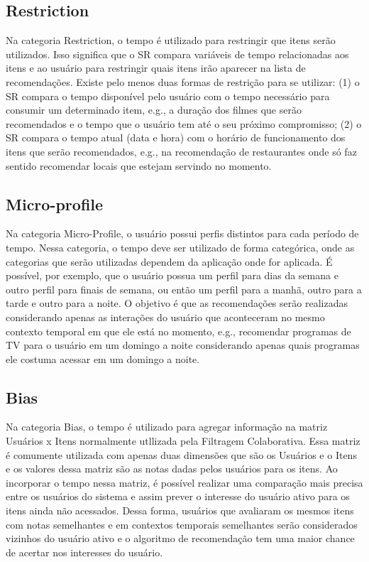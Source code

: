 \subsection{Restriction}

Na categoria Restriction, o tempo é utilizado para restringir que itens serão utilizados. Isso significa que o SR
compara variáveis de tempo relacionadas aos itens e ao usuário para restringir quais itens irão aparecer na lista de
recomendações. Existe pelo menos duas formas de restrição para se utilizar: (1) o SR compara o tempo disponível pelo
usuário com o tempo necessário para consumir um determinado item, e.g., a duração dos filmes que serão recomendados e
o tempo que o usuário tem até o seu próximo compromisso; (2) o SR compara o tempo atual (data e hora) com o horário de
funcionamento dos itens que serão recomendados, e.g., na recomendação de restaurantes onde só faz sentido recomendar
locais que estejam servindo no momento.

\subsection{Micro-profile}

Na categoria Micro-Profile, o usuário possui perfis distintos para cada período de tempo. Nessa categoria, o tempo
deve ser utilizado de forma categórica, onde as categorias que serão utilizadas dependem da aplicação onde for aplicada.
É possível, por exemplo, que o usuário possua um perfil para dias da semana e outro perfil para finais de semana, ou
então um perfil para a manhã, outro para a tarde e outro para a noite. O objetivo é que as recomendações serão
realizadas considerando apenas as interações do usuário que aconteceram no mesmo contexto temporal em que ele está no
momento, e.g., recomendar programas de TV para o usuário em um domingo a noite considerando apenas quais programas ele
costuma acessar em um domingo a noite.

\subsection{Bias}

Na categoria Bias, o tempo é utilizado para agregar informação na matriz Usuários x Itens normalmente utllizada pela
Filtragem Colaborativa. Essa matriz é comumente utilizada com apenas duas dimensões que são os Usuários e o Itens e os
valores dessa matriz são as notas dadas pelos usuários para os itens. Ao incorporar o tempo nessa matriz, é possível
realizar uma comparação mais precisa entre os usuários do sistema e assim prever o interesse do usuário ativo para os
itens ainda não acessados. Dessa forma, usuários que avaliaram os mesmos itens com notas semelhantes e em contextos
temporais semelhantes serão considerados vizinhos do usuário ativo e o algoritmo de recomendação tem uma maior chance
de acertar nos interesses do usuário.

